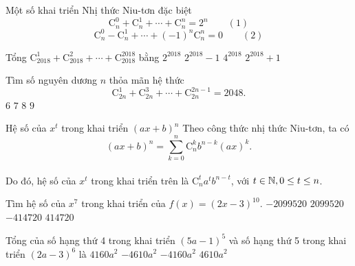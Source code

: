 \begin{dang}{Một số khai triển Nhị thức Niu-tơn đặc biệt}
	$$\mathrm{C}_n^0+\mathrm{C}_n^1+\cdots+\mathrm{C}_n^n=2^n  \qquad (1)$$
	$$\mathrm{C}_n^0-\mathrm{C}_n^1+\cdots+(-1)^n\mathrm{C}_n^n=0 \qquad (2)$$
\end{dang}
\begin{vd}%
	Tổng $\mathrm{C}_{2018}^1+\mathrm{C}_{2018}^2+\cdots+\mathrm{C}_{2018}^{2018}$ bằng
	\choice
	{$ 2^{2018} $}
	{\True $ 2^{2018}-1 $}
	{$ 4^{2018} $}
	{$ 2^{2018}+1 $}
\end{vd}
\begin{vd}%
	Tìm số nguyên dương $ n $ thỏa mãn hệ thức
	$$\mathrm{C}_{2n}^1+\mathrm{C}_{2n}^3+\cdots+\mathrm{C}_{2n}^{2n-1}=2048.$$
	\choice
	{\True $6$}
	{$7$}
	{$8$}
	{$9$}
\end{vd}
\begin{dang}{Hệ số của $ x^t $ trong khai triển $ (ax+b)^n $}
	Theo công thức nhị thức Niu-tơn, ta có
	 $$ (ax+b)^n=\sum\limits_{k=0}^n \mathrm{C}_n^kb^{n-k}(ax)^k .$$
	\\ Do đó, hệ số của $ x^t $ trong khai triển trên là $ \mathrm{C}_n^ta^tb^{n-t} $, với $t\in \Bbb N, 0\le t \le n$.
\end{dang}
\begin{vd}%
	Tìm hệ số của $ x^7 $ trong khai triển của $ f(x)=(2x-3)^{10} $.
	\choice
	{$-2099520$}
	{$2099520$}
	{\True $-414720$}
	{$414720$}	
\end{vd}
\begin{vd}%
	Tổng của số hạng thứ 4 trong khai triển $ (5a-1)^5 $ và số hạng thứ 5 trong khai triển $ (2a-3)^6 $ là
	\choice
	{$4160a^2$}
	{$-4610a^2 $}
	{$ - 4160a^2 $}
	{\True $4610a^2 $}
\end{vd} 

